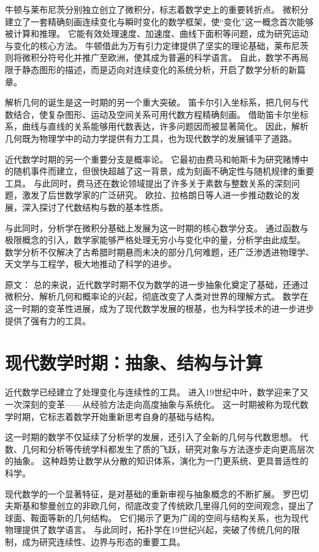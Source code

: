 牛顿与莱布尼茨分别独立创立了微积分，标志着数学史上的重要转折点。  
微积分建立了一套精确刻画连续变化与瞬时变化的数学框架，使“变化”这一概念首次能够被计算和推理。  
它能有效处理速度、加速度、曲线下面积等问题，成为研究运动与变化的核心方法。  
牛顿借此为万有引力定律提供了坚实的理论基础，莱布尼茨则将微积分符号化并推广至欧洲，使其成为普遍的科学语言。   
自此，数学不再局限于静态图形的描述，而是迈向对连续变化的系统分析，开启了数学分析的新篇章。

解析几何的诞生是这一时期的另一个重大突破。  
笛卡尔引入坐标系，把几何与代数结合，使复杂图形、运动及空间关系可用代数方程精确刻画。  
借助笛卡尔坐标系，曲线与直线的关系能够用代数表达，许多问题因而被显著简化。  
因此，解析几何既为物理学中的动力学提供有力工具，也为现代数学的发展铺平了道路。

近代数学时期的另一个重要分支是概率论。  
它最初由费马和帕斯卡为研究赌博中的随机事件而建立，但很快超越了这一背景，成为刻画不确定性与随机规律的重要工具。  
与此同时，费马还在数论领域提出了许多关于素数与整数关系的深刻问题，激发了后世数学家的广泛研究。  
欧拉、拉格朗日等人进一步推动数论的发展，深入探讨了代数结构与数的基本性质。

与此同时，分析学在微积分基础上发展为这一时期的核心数学分支。  
通过函数与极限概念的引入，数学家能够严格处理无穷小与变化中的量，分析学由此成型。  
数学分析不仅解决了古希腊时期悬而未决的部分几何难题，还广泛渗透进物理学、天文学与工程学，极大地推动了科学的进步。

原文：
总的来说，近代数学时期不仅为数学的进一步抽象化奠定了基础，还通过微积分、解析几何和概率论的兴起，彻底改变了人类对世界的理解方式。
数学在这一时期的变革性进展，成为了现代数学发展的根基，也为科学技术的进一步进步提供了强有力的工具。

\section{现代数学时期：抽象、结构与计算}

近代数学已经建立了处理变化与连续性的工具。  
进入19世纪中叶，数学迎来了又一次深刻的变革——从经验方法走向高度抽象与系统化。  
这一时期被称为现代数学时期，它标志着数学开始重新思考自身的基础与结构。

这一时期的数学不仅延续了分析学的发展，还引入了全新的几何与代数思想。  
代数、几何和分析等传统学科都发生了质的飞跃，研究对象与方法逐步走向更高层次的抽象。  
这种趋势让数学从分散的知识体系，演化为一门更系统、更具普适性的科学。

现代数学的一个显著特征，是对基础的重新审视与抽象概念的不断扩展。  
罗巴切夫斯基和黎曼创立的非欧几何，彻底改变了传统欧几里得几何的空间观念，提出了球面、鞍面等新的几何结构。  
它们揭示了更为广阔的空间与结构关系，也为现代物理提供了数学语言。  
与此同时，拓扑学在19世纪兴起，突破了传统几何的限制，成为研究连续性、边界与形态的重要工具。

